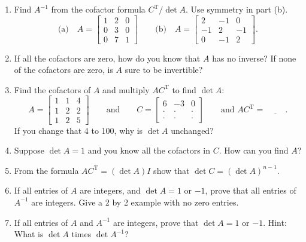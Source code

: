 \documentclass[14pt, a4paper]{article}
\begin{document}
\begin{enumerate}[resume]
    \item Find $A^{-1}$ from the cofactor formula $C^{\text{T}} / \det A$. Use symmetry in part (b).
          \[
              \text{(a)} \quad A = \begin{bmatrix} 1 & 2 & 0 \\ 0 & 3 & 0 \\ 0 & 7 & 1 \end{bmatrix} \qquad
              \text{(b)} \quad A = \begin{bmatrix} 2 & -1 & 0 \\ -1 & 2 & -1 \\ 0 & -1 & 2 \end{bmatrix} .
          \]

    \item If all the cofactors are zero, how do you know that $A$ has no inverse? If none of the cofactors are zero, is $A$ sure to be invertible?

    \item Find the cofactors of $A$ and multiply $AC^{\text{T}}$ to find $\det A$:
          \[
              A = \begin{bmatrix} 1 & 1 & 4 \\ 1 & 2 & 2 \\ 1 & 2 & 5 \end{bmatrix} \qquad \text{and} \qquad
              C = \begin{bmatrix} 6 & -3 & 0 \\ \cdot & \cdot & \cdot \\ \cdot & \cdot & \cdot \end{bmatrix} \qquad \text{and }
              AC^{\text{T}} = \underline{\hspace{1cm}} .
          \]
          If you change that 4 to 100, why is $\det A$ unchanged?

    \item Suppose $\det A = 1$ and you know all the cofactors in $C$. How can you find $A$?

    \item From the formula $AC^{\text{T}} = (\det A)I$ show that $\det C = (\det A)^{n-1}$.

    \item If all entries of $A$ are integers, and $\det A = 1$ or $-1$, prove that all entries of $A^{-1}$ are integers. Give a 2 by 2 example with no zero entries.

    \item If all entries of $A$ and $A^{-1}$ are integers, prove that $\det A = 1$ or $-1$. Hint: What is $\det A$ times $\det A^{-1}$?


\end{enumerate}
\end{document}
